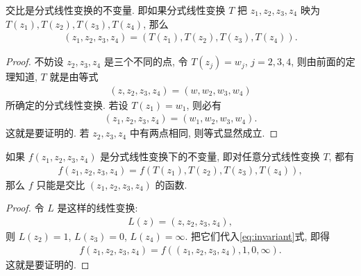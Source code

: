\documentclass[../../main.tex]{subfiles}%
\begin{document}
\begin{theorem}
交比是分式线性变换的不变量. 即如果分式线性变换 $T$ 把 $z_1,z_2,z_3,z_4$ 映为 $T(z_1),T(z_2),T(z_3),T(z_4)$, 那么
\begin{align*}
(z_1,z_2,z_3,z_4) = (T(z_1),T(z_2),T(z_3),T(z_4)).
\end{align*}
\end{theorem}

\begin{proof}
不妨设 $z_2,z_3,z_4$ 是三个不同的点, 令 $T(z_j) = w_j$, $j=2,3,4$, 则由前面的定理知道, $T$ 就是由等式
\begin{align*}
(z,z_2,z_3,z_4) = (w,w_2,w_3,w_4)
\end{align*}
所确定的分式线性变换. 若设 $T(z_1) = w_1$, 则必有
\begin{align*}
(z_1,z_2,z_3,z_4) = (w_1,w_2,w_3,w_4).
\end{align*}
这就是要证明的. 若 $z_2,z_3,z_4$ 中有两点相同, 则等式显然成立.
\end{proof}

\begin{theorem}
如果 $f(z_1,z_2,z_3,z_4)$ 是分式线性变换下的不变量, 即对任意分式线性变换 $T$, 都有
\begin{align}
f(z_1,z_2,z_3,z_4) = f(T(z_1),T(z_2),T(z_3),T(z_4)), \label{eq:invariant}
\end{align}
那么 $f$ 只能是交比 $(z_1,z_2,z_3,z_4)$ 的函数.
\end{theorem}

\begin{proof}
令 $L$ 是这样的线性变换:
\begin{align*}
L(z) = (z,z_2,z_3,z_4),
\end{align*}
则 $L(z_2) = 1$, $L(z_3) = 0$, $L(z_4) = \infty$. 把它们代入\eqref{eq:invariant}式, 即得
\begin{align*}
f(z_1,z_2,z_3,z_4) = f((z_1,z_2,z_3,z_4),1,0,\infty).
\end{align*}
这就是要证明的.
\end{proof}
\end{document}
